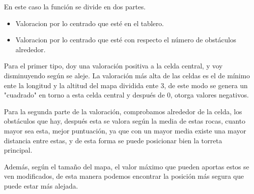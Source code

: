 En este caso la función se divide en dos partes.
\begin{itemize}
    \item Valoracion por lo centrado que esté en el tablero.
    \item Valoracion por lo centrado que esté con respecto el número de obstáculos alrededor.
\end{itemize}
Para el primer tipo, doy una valoración positiva a la celda central, y voy disminuyendo según se aleje. La valoración más alta de las celdas es el de mínimo ente la longitud y la altitud del mapa dividida ente 3, de este modo se genera un "cuadrado" en torno a esta celda central y después de 0, otorga valores negativos.

Para la segunda parte de la valoración, comprobamos alrededor de la celda, los obstáculos que hay, después esta se valora según la media de estas rocas, cuanto mayor sea esta, mejor puntuación, ya que con un mayor media existe una mayor distancia entre estas, y de esta forma se puede posicionar bien la torreta principal.

Además, según el tamaño del mapa, el valor máximo que pueden aportas estos se ven modificados, de esta manera podemos encontrar la posición más segura que puede estar más alejada.

